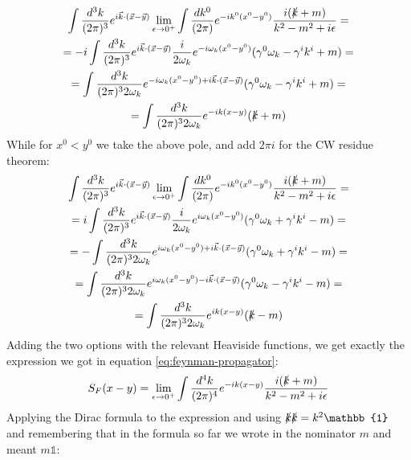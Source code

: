 \documentclass{article}
\begin{document}
\begin{equation}
\begin{gathered}
    \int \frac{d^3k}{(2\pi)^3} e^{i\vec{k}\cdot(\vec{x} - \vec{y})} \lim_{\epsilon\rightarrow0^{+}} \int \frac{dk^0}{(2\pi)} e^{-ik^0(x^0-y^0)}\frac{i(\slashed{k} + m)}{k^2 - m^2 + i\epsilon} = \\ =
    -i \int \frac{d^3k}{(2\pi)^3} e^{i\vec{k}\cdot(\vec{x} - \vec{y})} \frac{i}{2\omega_k}e^{-i\omega_k(x^0 - y^0)}(\gamma^0 \omega_k - \gamma^ik^i + m) = \\ =
    \int \frac{d^3k}{(2\pi)^32\omega_k} e^{-i\omega_k(x^0 - y^0)+i\vec{k}\cdot(\vec{x} - \vec{y})}(\gamma^0\omega_k - \gamma^ik^i + m) = \\ =
    \int \frac{d^3k}{(2\pi)^32\omega_k} e^{-ik(x - y)}(\slashed{k} + m)
\end{gathered}
\end{equation}
While for $x^0 < y^0$ we take the above pole, and add $2\pi i$ for the CW residue theorem:
\begin{equation}
\begin{gathered}
    \int \frac{d^3k}{(2\pi)^3} e^{i\vec{k}\cdot(\vec{x} - \vec{y})} \lim_{\epsilon\rightarrow0^{+}} \int \frac{dk^0}{(2\pi)} e^{-ik^0(x^0-y^0)}\frac{i(\slashed{k} + m)}{k^2 - m^2 + i\epsilon} = \\ =
    i \int \frac{d^3k}{(2\pi)^3} e^{i\vec{k}\cdot(\vec{x} - \vec{y})} \frac{i}{2\omega_k}e^{i\omega_k(x^0 - y^0)}(\gamma^0\omega_k + \gamma^ik^i - m) = \\ =
    -\int \frac{d^3k}{(2\pi)^32\omega_k} e^{i\omega_k(x^0 - y^0)+i\vec{k}\cdot(\vec{x} - \vec{y})}(\gamma^0\omega_k + \gamma^ik^i - m) = \\ =
    \int \frac{d^3k}{(2\pi)^32\omega_k} e^{i\omega_k(x^0 - y^0)-i\vec{k}\cdot(\vec{x} - \vec{y})}(\gamma^0\omega_k - \gamma^ik^i - m) = \\ =
    \int \frac{d^3k}{(2\pi)^32\omega_k} e^{ik(x - y)}(\slashed{k} - m)
\end{gathered}
\end{equation}
Adding the two options with the relevant Heaviside functions, we get exactly the expression we got in equation \ref{eq:feynman-propagator}:
\begin{equation}
    S_F(x-y) = \lim_{\epsilon\rightarrow0^{+}} \int \frac{d^4k}{(2\pi)^4} e^{-ik(x-y)}\frac{i(\slashed{k} +m )}{k^2 - m^2 + i\epsilon}
\end{equation}
Applying the Dirac formula to the expression and using $\slashed{k}\slashed{k} = k^2\mathbb{1}$ and remembering that in the formula so far we wrote in the nominator $m$ and meant $m\mathbb{1}$:
\end{document}
